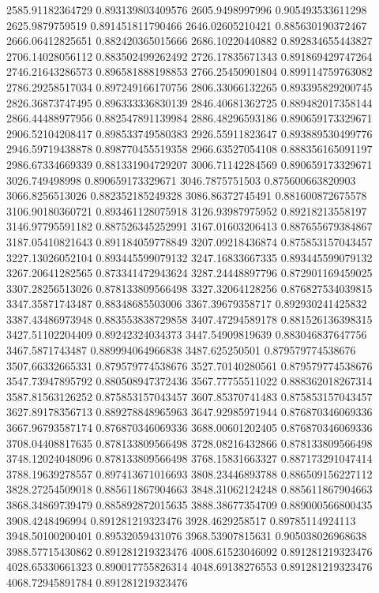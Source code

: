 {2585.91182364729 0.893139803409576
2605.9498997996 0.905493533611298
2625.9879759519 0.891451811790466
2646.02605210421 0.885630190372467
2666.06412825651 0.882420365015666
2686.10220440882 0.892834655443827
2706.14028056112 0.883502499262492
2726.17835671343 0.891869429747264
2746.21643286573 0.896581888198853
2766.25450901804 0.899114759763082
2786.29258517034 0.897249166170756
2806.33066132265 0.893395829200745
2826.36873747495 0.896333336830139
2846.40681362725 0.889482017358144
2866.44488977956 0.882547891139984
2886.48296593186 0.890659173329671
2906.52104208417 0.898533749580383
2926.55911823647 0.893889530499776
2946.59719438878 0.898770455519358
2966.63527054108 0.888356165091197
2986.67334669339 0.881331904729207
3006.71142284569 0.890659173329671
3026.749498998 0.890659173329671
3046.7875751503 0.875600663820903
3066.8256513026 0.882352185249328
3086.86372745491 0.881600872675578
3106.90180360721 0.893461128075918
3126.93987975952 0.89218213558197
3146.97795591182 0.887526345252991
3167.01603206413 0.887655679384867
3187.05410821643 0.891184059778849
3207.09218436874 0.875853157043457
3227.13026052104 0.893445599079132
3247.16833667335 0.893445599079132
3267.20641282565 0.873341472943624
3287.24448897796 0.872901169459025
3307.28256513026 0.878133809566498
3327.32064128256 0.876827534039815
3347.35871743487 0.88348685503006
3367.39679358717 0.892930241425832
3387.43486973948 0.883553838729858
3407.47294589178 0.881526136398315
3427.51102204409 0.89242324034373
3447.54909819639 0.883046837647756
3467.5871743487 0.889994064966838
3487.625250501 0.879579774538676
3507.66332665331 0.879579774538676
3527.70140280561 0.879579774538676
3547.73947895792 0.880508947372436
3567.77755511022 0.888362018267314
3587.81563126252 0.875853157043457
3607.85370741483 0.875853157043457
3627.89178356713 0.889278848965963
3647.92985971944 0.876870346069336
3667.96793587174 0.876870346069336
3688.00601202405 0.876870346069336
3708.04408817635 0.878133809566498
3728.08216432866 0.878133809566498
3748.12024048096 0.878133809566498
3768.15831663327 0.887173291047414
3788.19639278557 0.897413671016693
3808.23446893788 0.886509156227112
3828.27254509018 0.885611867904663
3848.31062124248 0.885611867904663
3868.34869739479 0.885892872015635
3888.38677354709 0.889000566800435
3908.4248496994 0.891281219323476
3928.4629258517 0.89785114924113
3948.50100200401 0.89532059431076
3968.53907815631 0.905038026968638
3988.57715430862 0.891281219323476
4008.61523046092 0.891281219323476
4028.65330661323 0.890017755826314
4048.69138276553 0.891281219323476
4068.72945891784 0.891281219323476
}
